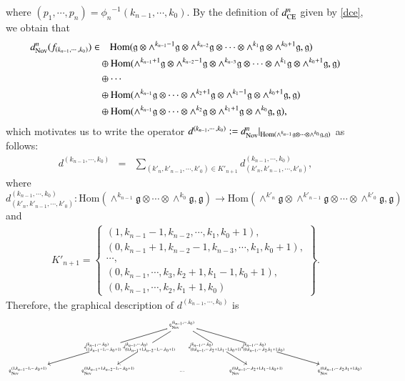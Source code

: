 \documentclass[12pt]{amsart}
\theoremstyle{definition}
\newcommand{\g}{\mathfrak g}
\newcommand{\frkC}{\mathfrak C}
\newcommand{\Hom}{\mathrm{Hom}}
\newcommand{\ot}{\otimes}
\newcommand{\ce}{{\rm CE}}
\newcommand{\nov}{{\rm Nov}}
\begin{document}
where $(p_1,\cdots,p_n)={\phi_n}^{-1}(k_{n-1},\cdots,k_0)$.
By the definition of $d_\ce^n$ given by \eqref{dce}, we obtain that
\begin{align*}
d_\nov^n(f_{(k_{n-1},\cdots,k_0)})\in
&\quad\Hom(\g\otimes\wedge^{k_{n-1}-1}\g\ot\wedge^{k_{n-2}}\g\ot\cdots\ot\wedge^{k_1}\g\ot\wedge^{{k_0}+1}\g,\g)\\
&\oplus\Hom(\wedge^{k_{n-1}+1}\g\ot\wedge^{k_{n-2}-1}\g\ot\wedge^{k_{n-3}}\g\ot\cdots\ot\wedge^{k_1}\g\ot\wedge^{{k_0}+1}\g,\g)\\
&\oplus\cdots\\
&\oplus\Hom(\wedge^{k_{n-1}}\g\ot\cdots\ot\wedge^{{k_2}+1}\g\ot\wedge^{{k_1}-1}\g\ot\wedge^{{k_0}+1}\g,\g)\\
&\oplus\Hom(\wedge^{k_{n-1}}\g\ot\cdots\ot\wedge^{{k_2}}\g\ot\wedge^{{k_1}+1}\g\ot\wedge^{{k_0}}\g,\g),
\end{align*}
which motivates us to write the operator $d^{(k_{n-1},\cdots,k_0)}:=d_\nov^n|_{\Hom(\wedge^{k_{n-1}}\g\ot\cdots\ot\wedge^{k_0}\g,\g)}$ as follows:
\begin{eqnarray*}
d^{(k_{n-1},\cdots,k_0)}&=&\sum_{(k'_n,k'_{n-1},\cdots,k'_0)\in K'_{n+1}}d^{(k_{n-1},\cdots,k_0)}_{(k'_n,k'_{n-1},\cdots,k'_0)},
\end{eqnarray*}
where $d^{(k_{n-1},\cdots,k_0)}_{(k'_n,k'_{n-1},\cdots,k'_0)}:\Hom(\wedge^{k_{n-1}}\g\ot\cdots\ot\wedge^{k_0}\g,\g)\to\Hom(\wedge^{k'_n}\g\ot\wedge^{k'_{n-1}}\g\ot\cdots\ot\wedge^{k'_0}\g,\g)$ and
\begin{eqnarray*}
K'_{n+1}=
\left\{
\begin{array}{l}
(1,k_{n-1}-1,k_{n-2},\cdots,k_1,k_0+1),\\[2mm]
(0,k_{n-1}+1,k_{n-2}-1,k_{n-3},\cdots,k_1,k_0+1),\\[2mm]
\cdots,\\[2mm]
(0,k_{n-1},\cdots,k_3,k_2+1,k_1-1,k_0+1),\\[2mm]
(0,k_{n-1},\cdots,k_2,k_1+1,k_0)
\end{array}
\right\}.
\end{eqnarray*}
Therefore, the graphical description of $d^{(k_{n-1},\cdots,k_0)}$ is
\begin{equation*}
{\tiny
\xymatrix@C=35.7pt@R=39pt{
&&
\frkC_\nov^{(k_{n-1},\cdots,k_0)}
\ar[dll]|{d^{(k_{n-1},\cdots,k_0)}_{(1,k_{n-1}-1,\cdots,k_0+1)}\quad}
\ar[dl]|{\qquad d^{(k_{n-1},\cdots,k_0)}_{(0,k_{n-1}+1,k_{n-2}-1,\cdots,k_0+1)}}
\ar[dr]|{d^{(k_{n-1},\cdots,k_0)}_{(0,k_{n-1},\cdots,k_2+1,k_1-1,k_0+1)}\qquad}
\ar[drr]|{\quad d^{(k_{n-1},\cdots,k_0)}_{(0,k_{n-1},\cdots,k_2,k_1+1,k_0)}}
&&
\\
\frkC_\nov^{(1,k_{n-1}-1,\cdots,k_0+1)}
&\frkC_\nov^{(0,k_{n-1}+1,k_{n-2}-1,\cdots,k_0+1)}
&\cdots
&\frkC_\nov^{(0,k_{n-1},\cdots,k_2+1,k_1-1,k_0+1)}
&\frkC_\nov^{(0,k_{n-1},\cdots,k_2,k_1+1,k_0)}
}
}
\end{equation*}
\end{document}
